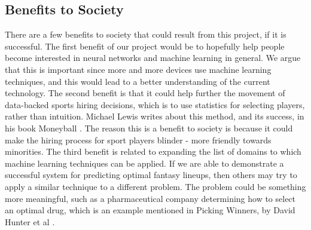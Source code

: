 \subsection{Benefits to Society}
There are a few benefits to society that could result from this project, if it is successful. The first benefit of our project would be to hopefully help people become interested in neural networks and machine learning in general. We argue that this is important since more and more devices use machine learning techniques, and this would lead to a better understanding of the current technology. The second benefit is that it could help further the movement of data-backed sports hiring decisions, which is to use statistics for selecting players, rather than intuition. Michael Lewis writes about this method, and its success, in his book Moneyball \cite{moneyball}. The reason this is a benefit to society is because it could make the hiring process for sport players blinder - more friendly towards minorities. The third benefit is related to expanding the list of domains to which machine learning techniques can be applied. If we are able to demonstrate a successful system for predicting optimal fantasy lineups, then others may try to apply a similar technique to a different problem. The problem could be something more meaningful, such as a pharmaceutical company determining how to select an optimal drug, which is an example mentioned in Picking Winners, by David Hunter et al \cite{picking_winners}.
